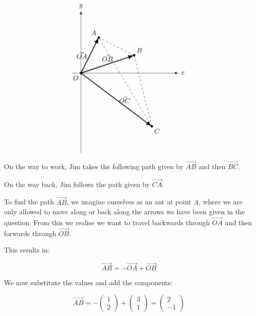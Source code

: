 \begin{solution}
    \[
    \begin{tikzpicture}[scale=0.9, >=Latex]

        \draw[->] (-0.5,0) -- (5.5,0) node[right] {$x$};
        \draw[->] (0,-4.5) -- (0,3.5) node[above] {$y$};

        \coordinate (O) at (0,0);
        \coordinate (A) at (1,2);
        \coordinate (B) at (3,1);
        \coordinate (C) at (4,-3);

        \draw[very thick,->] (O) -- (A) node[midway, left] {$\vec{OA}$};
        \draw[very thick,->] (O) -- (B) node[midway, above] {$\vec{OB}$};
        \draw[very thick,->] (O) -- (C) node[midway, right] {$\vec{OC}$};

        \draw[dashed] (A) -- (B);
        \draw[dashed] (B) -- (C);
        \draw[dashed] (C) -- (A);

        \fill (O) circle (2pt) node[below left] {$O$};
        \fill (A) circle (2pt) node[above left] {$A$};
        \fill (B) circle (2pt) node[above right] {$B$};
        \fill (C) circle (2pt) node[below right] {$C$};

    \end{tikzpicture}
    \]
    On the way to work, Jim takes the following path given by $\vec{AB}$ and then $\vec{BC}$.

    On the way back, Jim follows the path given by $\vec{CA}$.

    To find the path $\vec{AB}$, we imagine ourselves as an ant at point $A$, where we are only allowed to move along or back along the arrows 
    we have been given in the question. From this we realise we want to travel backwards through $\vec{OA}$ and then forwards through $\vec{OB}$.

    This results in:

    \[ \vec{AB} = -\vec{OA} + \vec{OB} \]

    We now substitute the values and add the components:

    \[ \vec{AB} = - \begin{pmatrix}1\\2\end{pmatrix} + \begin{pmatrix}3\\1\end{pmatrix} = \begin{pmatrix}2\\-1\end{pmatrix}\]


\end{solution}
